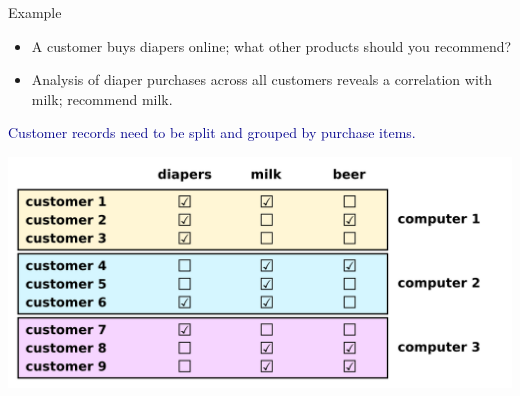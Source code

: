 \documentclass{beamer}
\begin{document}
\begin{frame}{}
\begin{block}{Example}
\begin{itemize}
\item A customer buys diapers online; what other products should you recommend?
\item Analysis of diaper purchases across all customers reveals a correlation with milk; recommend milk.
\end{itemize}
\end{block}

\vfill
\textcolor{darkblue}{Customer records need to be split and grouped by purchase items.}

\begin{center}
\includegraphics[width=0.9\linewidth]{distributed_data.png}
\end{center}
\end{frame}
\end{document}
